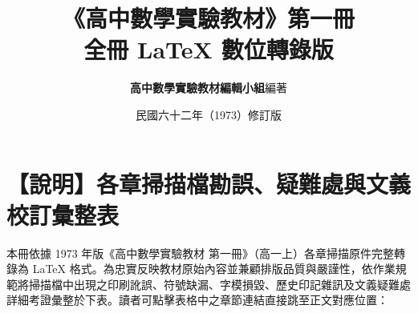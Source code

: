 \documentclass[a4paper,12pt,twoside]{article}
\title{\LARGE\textbf{《高中數學實驗教材》第一冊}\\[0.5em] \Large\textbf{全冊 \LaTeX{} 數位轉錄版}}
\author{\textbf{高中數學實驗教材編輯小組}\quad 編著}
\date{民國六十二年（1973）修訂版}
\begin{document}
\maketitle
\thispagestyle{empty}

\section*{【說明】各章掃描檔勘誤、疑難處與文義校訂彙整表}
\label{sec:master_errata_notes}

本冊依據 1973 年版《高中數學實驗教材 第一冊》（高一上）各章掃描原件完整轉錄為 \LaTeX{} 格式。為忠實反映教材原始內容並兼顧排版品質與嚴謹性，依作業規範將掃描檔中出現之印刷訛誤、符號缺漏、字模損毀、歷史印記雜訊及文義疑難處詳細考證彙整於下表。讀者可點擊表格中之章節連結直接跳至正文對應位置：
\end{document}
